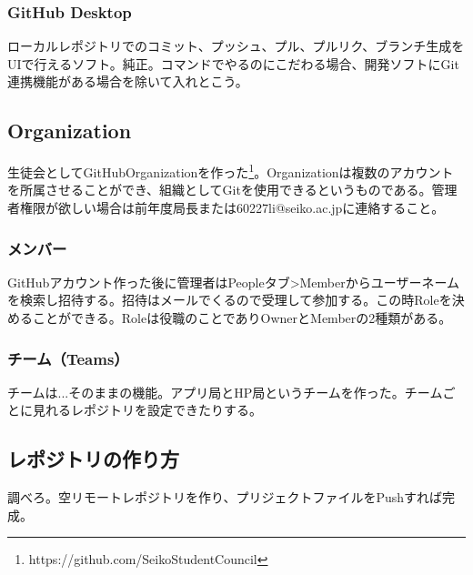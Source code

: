 \documentclass[dvipdfmx,jb5]{jreport}
\begin{document}
\subsubsection{GitHub Desktop}
ローカルレポジトリでのコミット、プッシュ、プル、プルリク、ブランチ生成をUIで行えるソフト。純正。コマンドでやるのにこだわる場合、開発ソフトにGit連携機能がある場合を除いて入れとこう。
\subsection{Organization}
生徒会としてGitHubOrganizationを作った\footnote{https://github.com/SeikoStudentCouncil}。Organizationは複数のアカウントを所属させることができ、組織としてGitを使用できるというものである。管理者権限が欲しい場合は前年度局長または60227li@seiko.ac.jpに連絡すること。
\subsubsection{メンバー}
GitHubアカウント作った後に管理者はPeopleタブ>Memberからユーザーネームを検索し招待する。招待はメールでくるので受理して参加する。この時Roleを決めることができる。Roleは役職のことでありOwnerとMemberの2種類がある。
\subsubsection{チーム（Teams）}
チームは...そのままの機能。アプリ局とHP局というチームを作った。チームごとに見れるレポジトリを設定できたりする。
\subsection{レポジトリの作り方}
調べろ。空リモートレポジトリを作り、プリジェクトファイルをPushすれば完成。
\end{document}

